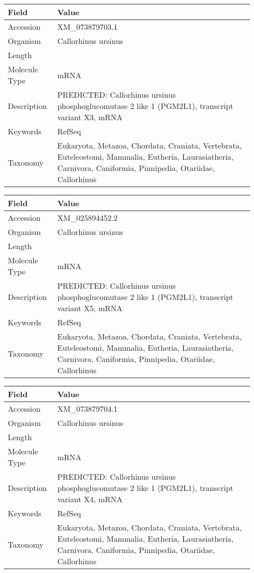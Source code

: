 \documentclass[10pt]{article}
\begin{document}
{\footnotesize
\begin{longtable}{>{\raggedright\arraybackslash}p{4.5cm} >{\raggedright\arraybackslash}p{11.5cm}}
\textbf{Field} & \textbf{Value} \\
\hline
Accession & XM\_073879703.1 \\
Organism & Callorhinus ursinus \\
Length & 2846 \\
Molecule Type & mRNA \\
Description & PREDICTED: Callorhinus ursinus phosphoglucomutase 2 like 1 (PGM2L1), transcript variant X3, mRNA \\
Keywords & RefSeq \\
Taxonomy & Eukaryota, Metazoa, Chordata, Craniata, Vertebrata, Euteleostomi, Mammalia, Eutheria, Laurasiatheria, Carnivora, Caniformia, Pinnipedia, Otariidae, Callorhinus \\
\end{longtable}
}

{\footnotesize
\begin{longtable}{>{\raggedright\arraybackslash}p{4.5cm} >{\raggedright\arraybackslash}p{11.5cm}}
\textbf{Field} & \textbf{Value} \\
\hline
Accession & XM\_025894452.2 \\
Organism & Callorhinus ursinus \\
Length & 2783 \\
Molecule Type & mRNA \\
Description & PREDICTED: Callorhinus ursinus phosphoglucomutase 2 like 1 (PGM2L1), transcript variant X5, mRNA \\
Keywords & RefSeq \\
Taxonomy & Eukaryota, Metazoa, Chordata, Craniata, Vertebrata, Euteleostomi, Mammalia, Eutheria, Laurasiatheria, Carnivora, Caniformia, Pinnipedia, Otariidae, Callorhinus \\
\end{longtable}
}

{\footnotesize
\begin{longtable}{>{\raggedright\arraybackslash}p{4.5cm} >{\raggedright\arraybackslash}p{11.5cm}}
\textbf{Field} & \textbf{Value} \\
\hline
Accession & XM\_073879704.1 \\
Organism & Callorhinus ursinus \\
Length & 2823 \\
Molecule Type & mRNA \\
Description & PREDICTED: Callorhinus ursinus phosphoglucomutase 2 like 1 (PGM2L1), transcript variant X4, mRNA \\
Keywords & RefSeq \\
Taxonomy & Eukaryota, Metazoa, Chordata, Craniata, Vertebrata, Euteleostomi, Mammalia, Eutheria, Laurasiatheria, Carnivora, Caniformia, Pinnipedia, Otariidae, Callorhinus \\
\end{longtable}
}
\end{document}
